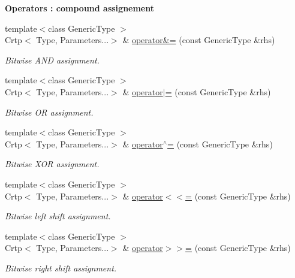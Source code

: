 \begin{Indent}{\bf Operators \-: compound assignement}
\begin{DoxyCompactItemize}
{\footnotesize template$<$class Generic\-Type $>$ }\\Crtp$<$ Type, Parameters...$>$ \& \hyperlink{classmagrathea_1_1StaticVectorizer_ab4d6cd5651a735815e1af42ab3ea21a6}{operator\&=} (const Generic\-Type \&rhs)
\begin{DoxyCompactList}\small\item\em Bitwise A\-N\-D assignment. \end{DoxyCompactList}\item 
{\footnotesize template$<$class Generic\-Type $>$ }\\Crtp$<$ Type, Parameters...$>$ \& \hyperlink{classmagrathea_1_1StaticVectorizer_a19c8eb2274664155f9b714200544247b}{operator$|$=} (const Generic\-Type \&rhs)
\begin{DoxyCompactList}\small\item\em Bitwise O\-R assignment. \end{DoxyCompactList}\item 
{\footnotesize template$<$class Generic\-Type $>$ }\\Crtp$<$ Type, Parameters...$>$ \& \hyperlink{classmagrathea_1_1StaticVectorizer_a38a45a8f2b81d90168197a26dac6fb0f}{operator$^\wedge$=} (const Generic\-Type \&rhs)
\begin{DoxyCompactList}\small\item\em Bitwise X\-O\-R assignment. \end{DoxyCompactList}\item 
{\footnotesize template$<$class Generic\-Type $>$ }\\Crtp$<$ Type, Parameters...$>$ \& \hyperlink{classmagrathea_1_1StaticVectorizer_a22eee562fea2e47fceb1a28f045d684a}{operator$<$$<$=} (const Generic\-Type \&rhs)
\begin{DoxyCompactList}\small\item\em Bitwise left shift assignment. \end{DoxyCompactList}\item 
{\footnotesize template$<$class Generic\-Type $>$ }\\Crtp$<$ Type, Parameters...$>$ \& \hyperlink{classmagrathea_1_1StaticVectorizer_af997b81383cd6fda10a5c816ab5fa066}{operator$>$$>$=} (const Generic\-Type \&rhs)
\begin{DoxyCompactList}\small\item\em Bitwise right shift assignment. \end{DoxyCompactList}\end{DoxyCompactItemize}
\end{Indent}

